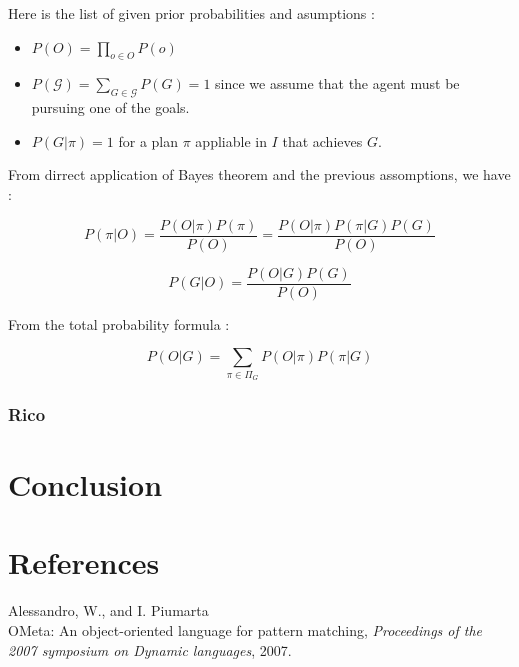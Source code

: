 \documentclass[11pt,a4paper,twoside,openright,titlepage,numbers=noenddot,headinclude,cleardoublepage=empty,openany]{scrreprt}
\theoremstyle{plain}
\theoremstyle{definition}
\theoremstyle{remark}
\providecommand{\tightlist}{%
  \setlength{\itemsep}{0pt}\setlength{\parskip}{0pt}}
\begin{document}
Here is the list of given prior probabilities and asumptions :

\begin{itemize}
\tightlist
\item
  \(P(O)=\prod_{o\in O} P(o)\)
\item
  \(P(\mathcal{G}) = \sum_{G\in \mathcal{G}}P(G) = 1\) since we assume
  that the agent must be pursuing one of the goals.
\item
  \(P(G|\pi) = 1\) for a plan \(\pi\) appliable in \(I\) that achieves
  \(G\).
\end{itemize}

From dirrect application of Bayes theorem and the previous assomptions,
we have :

\begin{equation} P(\pi|O) = \frac{P(O|\pi) P(\pi)}{P(O)} = \frac{P(O|\pi) P(\pi|G) P(G)}{P(O)}\label{eq:plan-obs}\end{equation}

\begin{equation} P(G|O) = \frac{P(O|G)P(G)}{P(O)}\label{eq:goal-obs}\end{equation}

From the total probability formula :

\begin{equation}P(O|G) = \sum_{\pi \in \Pi_G} P(O|\pi) P(\pi|G)\label{eq:obs-goal}\end{equation}

\hypertarget{rico}{%
\subsection{Rico}\label{rico}}

\hypertarget{conclusion}{%
\chapter{Conclusion}\label{conclusion}}

\hypertarget{refs}{}
\hypertarget{references}{%
\chapter{References}\label{references}}

\leavevmode\hypertarget{ref-alessandro_ometa_2007}{}%
Alessandro, W., and I. Piumarta\\
OMeta: An object-oriented language for pattern matching,
\emph{Proceedings of the 2007 symposium on Dynamic languages}, 2007.
\end{document}

